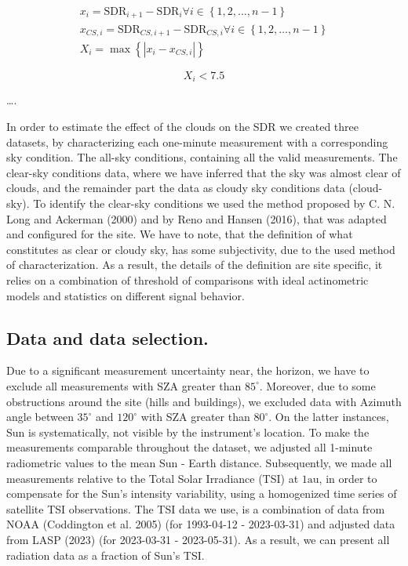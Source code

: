 \documentclass[
  preprint, 3p, authoryear]{article}
\begin{document}
\begin{gather}
x_i = \text{SDR}_{i+1} - \text{SDR}_{i} \forall i \in \left \{ 1, 2, \ldots, n-1 \right \} \label{eq:VSM1} \\
x_{CS,i} = \text{SDR}_{CS,i+1} - \text{SDR}_{CS,i} \forall i \in \left \{ 1, 2, \ldots, n-1 \right \} \label{eq:VSM2} \\
X_i = \max{\left \{ \left | x_i - x_{CS,i} \right | \right \}} \label{eq:VSM3}
\end{gather}

\begin{equation}
X_i < 7.5
\label{eq:VSMcr}
\end{equation}

\ldots.

In order to estimate the effect of the clouds on the SDR we created three datasets, by characterizing each one-minute measurement with a corresponding sky condition.
The all-sky conditions, containing all the valid measurements.
The clear-sky conditions data, where we have inferred that the sky was almost clear of clouds, and the remainder part the data as cloudy sky conditions data (cloud-sky).
To identify the clear-sky conditions we used the method proposed by C. N. Long and Ackerman (2000) and by Reno and Hansen (2016), that was adapted and configured for the site.
We have to note, that the definition of what constitutes as clear or cloudy sky, has some subjectivity, due to the used method of characterization.
As a result, the details of the definition are site specific, it relies on a combination of threshold of comparisons with ideal actinometric models and statistics on different signal behavior.

\hypertarget{data-and-data-selection.}{%
\subsection{Data and data selection.}\label{data-and-data-selection.}}

Due to a significant measurement uncertainty near, the horizon, we have to exclude
all measurements with SZA greater than \(85^\circ\).
Moreover, due to some obstructions around the site (hills and buildings), we excluded data with Azimuth angle between
\(35^\circ\) and \(120^\circ\) with SZA greater than \(80^\circ\).
On the latter instances, Sun is systematically, not visible by the instrument's location.
To make the measurements comparable throughout the dataset, we adjusted all 1-minute radiometric values to the mean Sun - Earth distance.
Subsequently, we made all measurements relative to the Total Solar Irradiance (TSI) at \(1 \text{au}\), in order to compensate for the Sun's intensity variability, using a homogenized time series of satellite TSI observations.
The TSI data we use, is a combination of data from NOAA (Coddington et al. 2005) (for 1993-04-12 - 2023-03-31) and adjusted data from LASP (2023) (for 2023-03-31 - 2023-05-31).
As a result, we can present all radiation data as a fraction of Sun's TSI.
\end{document}
